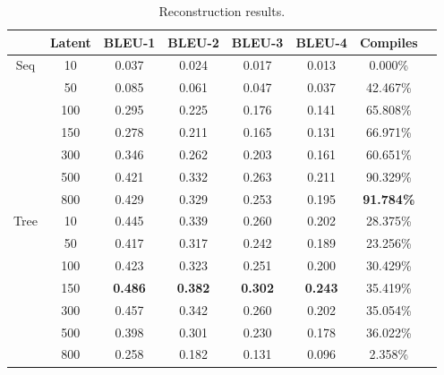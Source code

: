 \begin{table}[ht!]
\centering
\begingroup
\setlength{\tabcolsep}{3pt} %
\renewcommand{\arraystretch}{1.4} %
\begin{tabular}{cccccccc}
 & \textbf{Latent} & \textbf{BLEU-1} & \textbf{BLEU-2} & \textbf{BLEU-3} & \textbf{BLEU-4} & \textbf{Compiles}\\ \hline
\multirow{7}{*}{Seq}    &   10   &  0.037   &    0.024     &     0.017     &    0.013       &    0.000\%   \\
                            &   50   &      0.085    &      0.061         &         0.047      &    0.037       &       42.467\%      \\
                            &   100   &  0.295   &      0.225     &     0.176      &    0.141       &   65.808\%               \\
                            &   150   &     0.278  & 0.211          & 0.165          & 0.131          &  66.971\%              \\
                            &   300   & 0.346                     &  0.262                        &     0.203                     &     0.161                     & 60.651\% \\   
                            &   500   &  0.421                   &      0.332                    &         0.263                 &      0.211                    &  90.329\% \\
                            &   800   &  0.429                   &      0.329                    &         0.253                 &      0.195                    &  \textbf{91.784\%} \\\hline
\multirow{7}{*}{Tree}  &   10   &  0.445  &    0.339     &     0.260     &     0.202      &   28.375\%    \\
                        &   50   &     0.417    &      0.317    &       0.242    & 0.189  &  23.256\% \\
                            &   100   &     0.423      &      0.323     &     0.251      &  0.200 &      30.429\%     \\
                            &   150   & \textbf{0.486} &     \textbf{0.382}    &  \textbf{0.302}     &      \textbf{0.243}    &   35.419\%           \\
                            &   300   &   0.457                 &     0.342                &      0.260                &     0.202                   & 35.054\% \\   
                            &   500   &     0.398                &      0.301             & 0.230      &             0.178             &            36.022\%      \\
                             &   800   &     0.258                &      0.182             & 0.131      &             0.096             &     2.358\%      \\
\end{tabular}
\endgroup
\caption{Reconstruction results.}
\label{tab:rec_results}
\end{table}

